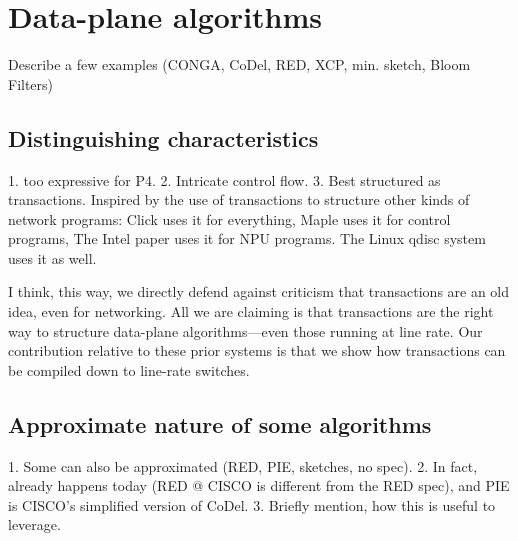 \section{Data-plane algorithms}
\label{s:dataplane}
Describe a few examples (CONGA, CoDel, RED, XCP, min. sketch, Bloom Filters)

\subsection{Distinguishing characteristics}
1. too expressive for P4.
2. Intricate control flow.
3. Best structured as transactions. Inspired by the use of transactions to structure other kinds of network programs: Click uses it for everything,
Maple uses it for control programs,
The Intel paper uses it for NPU programs.
The Linux qdisc system uses it as well.

I think, this way, we directly defend against criticism that transactions are an old idea, even for networking. All we are claiming is that transactions are the right way to structure data-plane algorithms---even those running at line rate. Our contribution relative to these prior systems is that we show how transactions can be compiled down to line-rate switches.


\subsection{Approximate nature of some algorithms}
1. Some can also be approximated (RED, PIE, sketches, no spec).
2. In fact, already happens today (RED @ CISCO is different from the RED spec), and PIE is CISCO's simplified version of CoDel.
3. Briefly mention, how this is useful to leverage.
